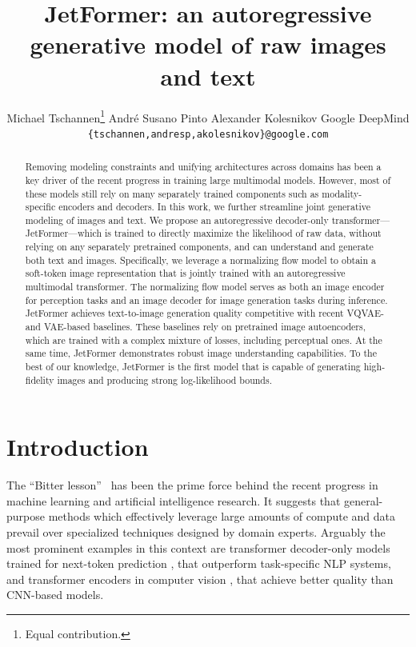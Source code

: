 \documentclass{article} %
\title{JetFormer: an autoregressive \\ generative model of raw images and text}
\author{Michael Tschannen\thanks{Equal contribution.}  \And
Andr\'e Susano Pinto\footnotemark[1] \And
Alexander Kolesnikov\footnotemark[1] \AND
\normalfont Google DeepMind \quad \small \texttt{\{tschannen,andresp,akolesnikov\}@google.com}}
\begin{document}
\maketitle

\begin{abstract}
Removing modeling constraints and unifying architectures across domains has been a key driver of the recent progress in training large multimodal models. However, most of these models still rely on many separately trained components such as modality-specific encoders and decoders. In this work, we further streamline joint generative modeling of images and text. We propose an autoregressive decoder-only transformer---JetFormer---which is trained to directly maximize the likelihood of raw data, without relying on any separately pretrained components, and can understand and generate both text and images. Specifically, we leverage a normalizing flow model to obtain a soft-token image representation that is jointly trained with an autoregressive multimodal transformer. The normalizing flow model serves as both an image encoder for perception tasks and an image decoder for image generation tasks during inference. JetFormer achieves text-to-image generation quality competitive with recent VQVAE- and VAE-based baselines. These baselines rely on pretrained image autoencoders, which are trained with a complex mixture of losses, including perceptual ones. At the same time, JetFormer demonstrates robust image understanding capabilities. To the best of our knowledge, JetFormer is the first model that is capable of generating high-fidelity images and producing strong log-likelihood bounds.
\end{abstract}

\vspace{-3mm}

\section{Introduction}

The ``Bitter lesson''~\citep{sutton2019bitter} has been the prime force behind the recent progress in machine learning and artificial intelligence research.
It suggests that general-purpose methods which effectively leverage large amounts of compute and data prevail over specialized techniques designed by domain experts.
Arguably the most prominent examples in this context are transformer decoder-only models trained for next-token prediction \citep{vaswani2017attention, radford2018improving}, that outperform task-specific NLP systems, and transformer encoders in computer vision \citep{dosovitskiy2020image, strudel2021segmenter, li2022exploring}, that achieve better quality than CNN-based models.
\end{document}
